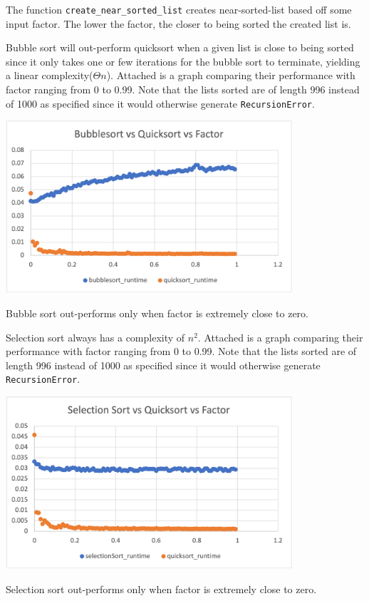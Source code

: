 \documentclass{article}
\begin{document}
\medskip
The function \verb|create_near_sorted_list| creates near-sorted-list based off 
some input factor. The lower the factor, the closer to being sorted the created list is.

Bubble sort will out-perform quicksort when a given list is close to being sorted 
since it only takes one or few iterations for the bubble sort to terminate, yielding 
a linear complexity($\Theta{n}$). Attached is a graph comparing their performance 
with factor ranging from 0 to 0.99. Note that the lists sorted are of length 996 
instead of 1000 as specified since it would otherwise generate \verb|RecursionError|.

\includegraphics[width=0.8\textwidth]{bubblesort_vs_quicksort_vs_factor}

Bubble sort out-performs only when factor is extremely close to zero.

\medskip
Selection sort always has a complexity of $n^2$. Attached is a graph comparing their 
performance with factor ranging from 0 to 0.99. Note that the lists sorted are of 
length 996 instead of 1000 as specified since it would otherwise generate \verb|RecursionError|.

\includegraphics[width=0.8\textwidth]{selectionSort_vs_quicksort_vs_factor}

Selection sort out-performs only when factor is extremely close to zero.
\end{document}
